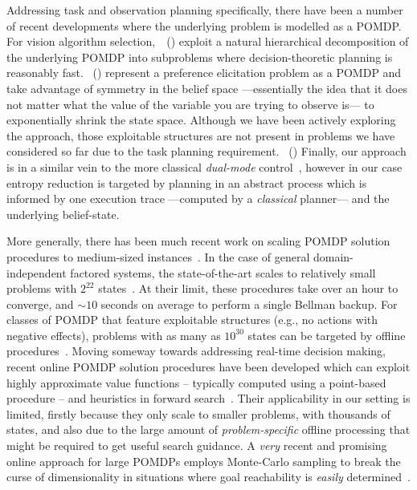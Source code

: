 






Addressing task and observation planning specifically, there have been
a number of recent developments where the underlying problem is
modelled as a POMDP.
For vision algorithm
selection,~\citeauthor{hippo-jnl}~(\citeyear{hippo-jnl}) exploit a
natural hierarchical decomposition of the underlying POMDP into
subproblems where decision-theoretic planning is reasonably
fast. \citeauthor{doshi08:pref_elic}~(\citeyear{doshi08:pref_elic})
represent a preference elicitation problem as a POMDP and take
advantage of symmetry in the belief space ---essentially the idea that
it does not matter what the value of the variable you are trying to
observe is--- to exponentially shrink the state space. Although we
have been actively exploring the \citeauthor{doshi08:pref_elic}
approach, those exploitable structures are not present in problems we
have considered so far due to the task planning requirement. 
\citeauthor{kurniawati:etal:2010}~(\citeyear{kurniawati:etal:2010}) 
Finally,
our approach is in a similar vein to the more classical {\em
dual-mode} control~\cite{cassandra96actingunder}, however in our case
entropy reduction is targeted by planning in an abstract process which
is informed by one execution trace ---computed by a {\em classical}
planner--- and the underlying belief-state.


More generally, there has been much recent work on scaling POMDP
solution procedures to medium-sized instances~\cite{shani:etal:08}. In
the case of general domain-independent factored systems, the
state-of-the-art scales to relatively small problems with $2^{22}$
states~\cite{shani:etal:2008}. At their limit, these procedures take
over an hour to converge, and $\sim10$ seconds on average to perform a
single Bellman backup.  For classes of POMDP that feature exploitable
structures (e.g., no actions with negative effects), problems with as
many as $10^{30}$ states can be targeted by offline
procedures~\cite{brunskill:russell:2010}. Moving someway towards
addressing real-time decision making, recent online POMDP solution
procedures have been developed which can exploit highly approximate
value functions -- typically computed using a point-based procedure --
and heuristics in forward search~\cite{ross:etal:2008}. Their
applicability in our setting is limited, firstly because they only
scale to smaller problems, with thousands of states, and also due to
the large amount of
\emph{problem-specific} offline processing that might be required to get useful
search guidance. A {\em very} recent and promising online approach for
large POMDPs employs Monte-Carlo sampling to break the curse of
dimensionality in situations where goal reachability is {\em easily}
determined~\cite{silver:veness:2010}.


